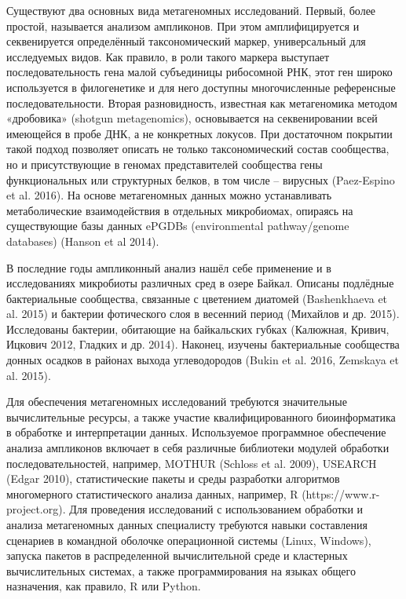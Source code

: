 \documentclass[12pt]{llncs}  %
\begin{document}
Существуют два основных вида метагеномных исследований. Первый, более простой, называется анализом ампликонов. При этом амплифицируется и секвенируется определённый таксономический маркер, универсальный для исследуемых видов. Как правило, в роли такого маркера выступает последовательность гена малой субъединицы рибосомной РНК, этот ген широко используется в филогенетике и для него доступны многочисленные референсные последовательности.  Вторая разновидность, известная как метагеномика методом «дробовика» (shotgun metagenomics), основывается на секвенировании всей имеющейся в пробе ДНК, а не конкретных локусов. При достаточном покрытии такой подход позволяет описать не только таксономический состав сообщества, но и присутствующие в геномах представителей сообщества гены функциональных или структурных белков, в том числе – вирусных (Paez-Espino et al. 2016). На основе метагеномных данных можно устанавливать метаболические взаимодействия  в отдельных микробиомах, опираясь на существующие базы данных ePGDBs (environmental pathway/genome databases) (Hanson et al 2014).

В последние годы ампликонный анализ нашёл себе применение и в исследованиях микробиоты различных сред в озере Байкал. Описаны подлёдные бактериальные сообщества, связанные с цветением диатомей (Bashenkhaeva et al. 2015) и бактерии фотического слоя в весенний период (Михайлов и др. 2015). Исследованы бактерии, обитающие на байкальских губках (Калюжная, Кривич, Ицкович 2012, Гладких и др. 2014). Наконец, изучены бактериальные сообщества донных осадков в районах выхода углеводородов (Bukin et al. 2016, Zemskaya et al. 2015).

Для обеспечения  метагеномных исследований требуются значительные вычислительные ресурсы, а также участие квалифицированного биоинформатика в обработке и интерпретации данных. Используемое программное обеспечение анализа ампликонов включает в себя различные библиотеки модулей обработки последовательностей, например, MOTHUR (Schloss et al. 2009), USEARCH (Edgar 2010), статистические пакеты и среды разработки алгоритмов многомерного статистического анализа данных, например, R (https://www.r-project.org). Для проведения исследований с использованием обработки и анализа метагеномных данных специалисту требуются навыки составления сценариев в командной оболочке операционной системы (Linux, Windows), запуска пакетов в распределенной вычислительной среде и кластерных вычислительных системах, а также программирования на языках общего назначения, как правило, R или Python.
\end{document}
